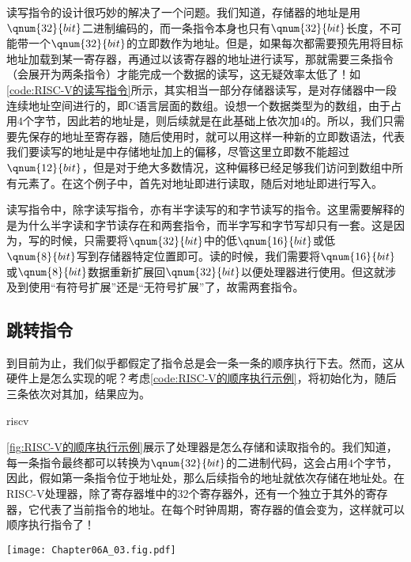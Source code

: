 读写指令的设计很巧妙的解决了一个问题。我们知道，存储器的地址是用$\qnum{32}{bit}$二进制编码的，而一条指令本身也只有$\qnum{32}{bit}$长度，不可能带一个$\qnum{32}{bit}$的立即数作为地址。但是，如果每次都需要预先用将目标地址加载到某一寄存器，再通过以该寄存器的地址进行读写，那就需要三条指令（会展开为两条指令）才能完成一个数据的读写，这无疑效率太低了！如\cref{code:RISC-V的读写指令}所示，其实相当一部分存储器读写，是对存储器中一段连续地址空间进行的，即C语言层面的数组。设想一个数据类型为的数组，由于占用$4$个字节，因此若的地址是，则后续就是在此基础上依次加$4$的。所以，我们只需要先保存的地址至寄存器，随后使用时，就可以用这样一种新的立即数语法，代表我们要读写的地址是中存储地址加上的偏移，尽管这里立即数不能超过$\qnum{12}{bit}$，但是对于绝大多数情况，这种偏移已经足够我们访问到数组中所有元素了。在这个例子中，首先对地址即进行读取，随后对地址即进行写入。

读写指令中，除字读写指令，亦有半字读写的和字节读写的指令。这里需要解释的是为什么半字读和字节读存在和两套指令，而半字写和字节写却只有一套。这是因为，写的时候，只需要将$\qnum{32}{bit}$中的低$\qnum{16}{bit}$或低$\qnum{8}{bit}$写到存储器特定位置即可。读的时候，我们需要将$\qnum{16}{bit}$或$\qnum{8}{bit}$数据重新扩展回$\qnum{32}{bit}$以便处理器进行使用。但这就涉及到使用“有符号扩展”还是“无符号扩展”了，故需两套指令。

\subsection{跳转指令}
到目前为止，我们似乎都假定了指令总是会一条一条的顺序执行下去。然而，这从硬件上是怎么实现的呢？考虑\cref{code:RISC-V的顺序执行示例}，将初始化为，随后三条依次对其加，结果应为。
\begin{Code}{riscv}
    
\end{Code}

\cref{fig:RISC-V的顺序执行示例}展示了处理器是怎么存储和读取指令的。我们知道，每一条指令最终都可以转换为$\qnum{32}{bit}$的二进制代码，这会占用$4$个字节，因此，假如第一条指令位于地址处，那么后续指令的地址就依次存储在地址处。在RISC-V处理器，除了寄存器堆中的$32$个寄存器外，还有一个独立于其外的寄存器，它代表了当前指令的地址。在每个时钟周期，寄存器的值会变为，这样就可以顺序执行指令了！
\begin{Figure}
    \texttt{[image: Chapter06A\_03.fig.pdf]}
\end{Figure}


